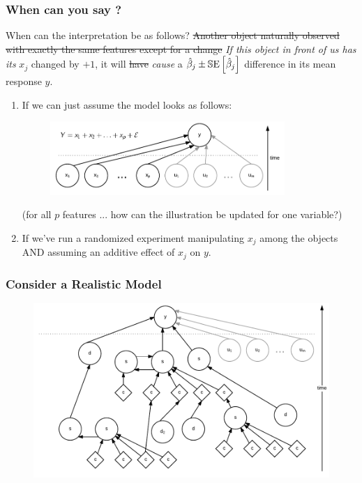 \documentclass[handout]{beamer}
\begin{document}
\begin{frame}\frametitle{When can you say ?}

\small

When can the interpretation be as follows? \sout{Another object naturally observed with exactly the same features except for a change} \emph{If this object in front of us has its} \pause $x_j$ changed by $+1$, it will \sout{have} \emph{cause} a $\hat{\beta}_j \pm \mathbb{S}\text{E}\left[\hat{\beta}_j\right]$ difference in its mean response $y$.

\begin{enumerate}
\item If we can just assume the model looks as follows:

\vspace{-0.3cm}

\begin{figure}
\centering
\includegraphics[width=3.5in]{get_causality}
\end{figure}

(for all $p$ features ... how can the illustration be updated for one variable?) 

\item \pause If we've run a randomized experiment manipulating $x_j$ among the objects AND assuming an additive effect of $x_j$ on $y$.
\end{enumerate}

\end{frame}

\begin{frame}\frametitle{Consider a Realistic Model}

\begin{figure}
\centering
\includegraphics[width=4.5in]{realistic_model}
\end{figure}


\end{frame}
\end{document}

